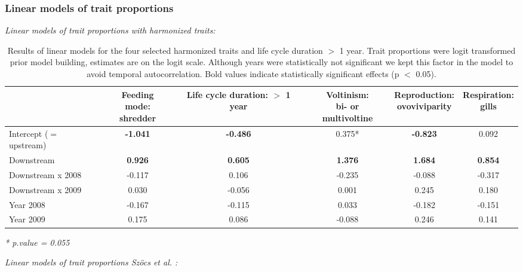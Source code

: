 \documentclass[../Draft_harmonization_paper.tex]{subfiles}
\begin{document}
\newpage
\subsubsection*{Linear models of trait proportions}

\textit{Linear models of trait proportions with harmonized traits:}
\begin{table}[ht]
    \centering
    \caption{Results of linear models for the four selected harmonized traits and life cycle duration $>$ 1 year. Trait proportions were logit transformed prior model building, estimates are on the logit scale. Although years were statistically not significant we kept this factor in the model to avoid temporal autocorrelation. Bold values indicate statistically significant effects (p $<$ 0.05).}
    \label{stab:linear_models_new}
    \begin{tabular}{l|ccccc}
    \toprule[.1em]
    & \specialcell{Feeding mode:\\ shredder} & \specialcell{Life cycle duration:\\ $>$ 1 year} & \specialcell{Voltinism:\\ bi- or multivoltine} & \specialcell{Reproduction:\\ ovoviviparity} & \specialcell{Respiration:\\ gills} \\ 
    \toprule[.1em]
    Intercept ($=$ upstream) & \textbf{-1.041} & \textbf{-0.486} & 0.375* & \textbf{-0.823} & 0.092\\ 
    Downstream & \textbf{0.926} & \textbf{0.605} & \textbf{1.376} & \textbf{1.684} & \textbf{0.854}\\ 
    Downstream x 2008 & -0.117 & 0.106 & -0.235 & -0.088 & -0.317\\ 
    Downstream x 2009 & 0.030 & -0.056 & 0.001 & 0.245 & 0.180\\ 
    Year 2008 & -0.167 & -0.115 & 0.033 & -0.182 & -0.151\\ 
    Year 2009 & 0.175 & 0.086 & -0.088 & 0.246 & 0.141\\ 
    \bottomrule
    \end{tabular}
    \textit{* p.value = 0.055}
\end{table}
\newline
\newline
\newline
\textit{Linear models of trait proportions Szöcs et al. :}
\end{document}
